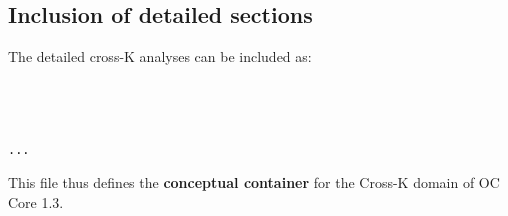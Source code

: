 \subsection{Inclusion of detailed sections}
\noindent The detailed cross-K analyses can be included as:
\begin{verbatim}



...

\end{verbatim}

\noindent This file thus defines the \textbf{conceptual container} for the
Cross-K domain of OC Core 1.3.

